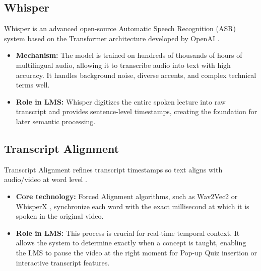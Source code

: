 \subsection{Whisper}
Whisper is an advanced open-source Automatic Speech Recognition (ASR)
system based on the Transformer architecture developed by OpenAI
\cite{radford2023robust}.
\begin{itemize}
    \item \textbf{Mechanism:} The model is trained on hundreds of
          thousands of hours of multilingual audio, allowing it to
          transcribe audio into text with high accuracy. It handles
          background noise, diverse accents, and complex technical terms
          well.
    \item \textbf{Role in LMS:} Whisper digitizes the entire spoken
          lecture into raw transcript and provides sentence-level
          timestamps, creating the foundation for later semantic
          processing.
\end{itemize}

\subsection{Transcript Alignment}
Transcript Alignment refines transcript timestamps so text aligns with
audio/video at word level \cite{mcauliffe2017montreal}.
\begin{itemize}
    \item \textbf{Core technology:} Forced Alignment algorithms, such as
          Wav2Vec2 \cite{baevski2020wav2vec} or WhisperX
          \cite{bain2023whisperx}, synchronize each word with the exact
          millisecond at which it is spoken in the original video.
    \item \textbf{Role in LMS:} This process is crucial for real-time
          temporal context. It allows the system to determine exactly when
          a concept is taught, enabling the LMS to pause the video at the
          right moment for Pop-up Quiz insertion or interactive
          transcript features.
\end{itemize}

